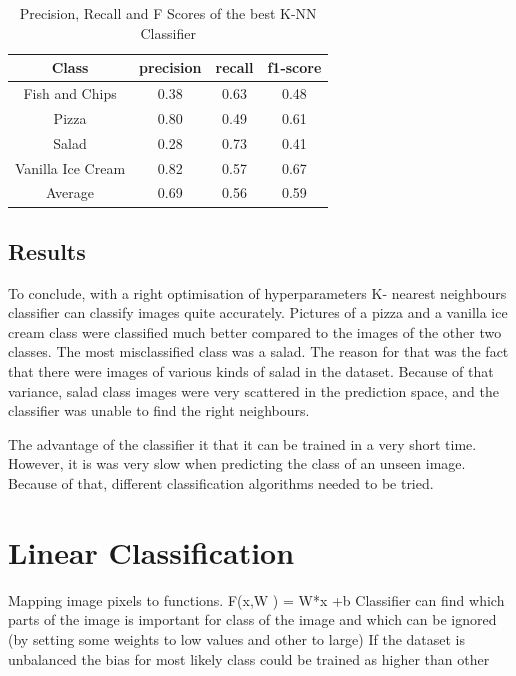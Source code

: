 \begin{table}[h!]
\begin{center}
\begin{tabular}{ |c|c|c|c| } 
 \hline
 Class & precision &   recall & f1-score  \\ \hline
 Fish and Chips    &   0.38   &   0.63  &    0.48   \\
            Pizza   &    0.80  &    0.49 &     0.61 \\
            Salad    &   0.28  &    0.73  &    0.41  \\
Vanilla Ice Cream     &  0.82  &    0.57   &   0.67   \\ \hline
     Average     &  0.69   &   0.56    &  0.59  \\
 \hline
\end{tabular}
\caption{Precision, Recall and F Scores of the best K-NN Classifier}
\label{table:1}
\end{center}
\end{table}


   

\subsection{Results}

To conclude, with a right optimisation of hyperparameters K- nearest neighbours classifier can classify images quite accurately. Pictures of a pizza and a vanilla ice cream class were classified much better compared to the images of the other two classes. The most misclassified class was a salad. The reason for that was the fact that there were images of various kinds of salad in the dataset. Because of that variance, salad class images were very scattered in the prediction space, and the classifier was unable to find the right neighbours.

The advantage of the classifier it that it can be trained in a very short time. However, it is was very slow when predicting the class of an unseen image. Because of that, different classification algorithms needed to be tried.
\iffalse
\section{Linear Classification}

Mapping image pixels to functions. 
F(x,W ) = W*x +b
Classifier can find which parts of the image is important for class of the image and which can be ignored (by setting some weights to low values and other to large)
If the dataset is unbalanced the bias for most likely class could be trained as higher than other

